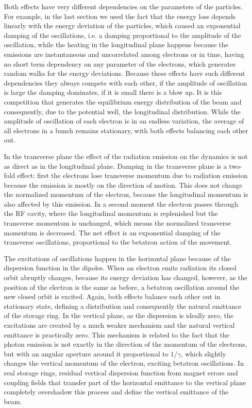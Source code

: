     Both effects have very different dependencies on the parameters of the particles. For example, in the last section we used the fact that the energy loss depends linearly with the energy deviation of the particles, which caused an exponential damping of the oscillations, i.e. a damping proportional to the amplitude of the oscillation, while the heating in the longitudinal plane happens because the emissions are instantaneous and uncorrelated among electrons or in time, having no short term dependency on any parameter of the electrons, which generates random walks for the energy deviations. Because these effects have such different dependencies they always compete with each other, if the amplitude of oscillation is large the damping dominates, if it is small there is a blow up. It is this competition that generates the equilibrium energy distribution of the beam and consequently, due to the potential well, the longitudinal distribution. While the amplitude of oscillation of each electron is in an endless variation, the average of all electrons in a bunch remains stationary, with both effects balancing each other out.

    In the transverse plane the effect of the radiation emission on the dynamics is not as direct as in the longitudinal plane. Damping in the transverse plane is a two-fold effect: first the electrons lose transverse momentum due to radiation emission because the emission is mostly on the direction of motion. This does not change the normalized momentum of the electron, because the longitudinal momentum is also affected by this emission. In a second moment the electron passes through the RF cavity, where the longitudinal momentum is replenished but the transverse momentum is unchanged, which means the normalized transverse momentum is decreased. The net effect is an exponential damping of the transverse oscillations, proportional to the betatron action of the movement.

    The excitations of oscillations happen in the horizontal plane because of the dispersion function in the dipoles. When an electron emits radiation its closed orbit abruptly changes, because its energy deviation has changed, however, as the position of the electron is the same as before, a betatron oscillation around the new closed orbit is excited. Again, both effects balance each other out in stationary state, defining a distribution and consequently the natural emittance of the storage ring. In the vertical plane, as the dispersion is ideally zero, the excitations are created by a much weaker mechanism and the natural vertical emittance is practically zero. This mechanism is related to the fact that the photon emission is not exactly in the direction of the momentum of the electrons, but with an angular aperture around it proportional to $1/\gamma$, which slightly changes the vertical momentum of the electron, exciting betatron oscillations. In real storage rings, residual vertical dispersion function from magnet errors and coupling fields that transfer part of the horizontal emittance to the vertical plane completely overshadow this process and define the vertical emittance of the beam.

